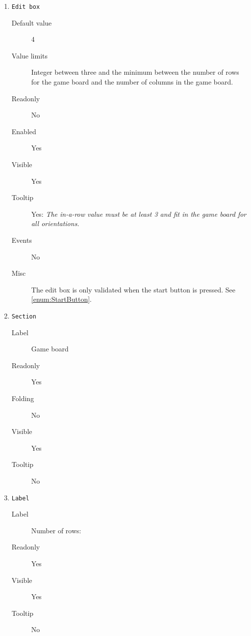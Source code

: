 \begin{enumerate}
    \item \texttt{Edit box} \label{enum:InARowEditBox}
              \begin{description}
                  \item[Default value] 4
                  \item[Value limits] Integer between three and the minimum between
                                      the number of rows for the game board and the
                                      number of columns in the game board.
                  \item[Readonly] No
                  \item[Enabled] Yes
                  \item[Visible] Yes
                  \item[Tooltip] Yes: \textit{The in-a-row value must be at least 3
                                      and fit in the game board for all orientations.}
                  \item[Events] No
                  \item[Misc] The edit box is only validated when the start button is
                              pressed. See \cref{enum:StartButton}.
              \end{description}

    \item \texttt{Section}
              \begin{description}
                  \item[Label] Game board
                  \item[Readonly] Yes
                  \item[Folding] No
                  \item[Visible] Yes
                  \item[Tooltip] No
              \end{description}

    \item \texttt{Label}
              \begin{description}
                  \item[Label] Number of rows:
                  \item[Readonly] Yes
                  \item[Visible] Yes
                  \item[Tooltip] No
              \end{description}


\end{enumerate}
